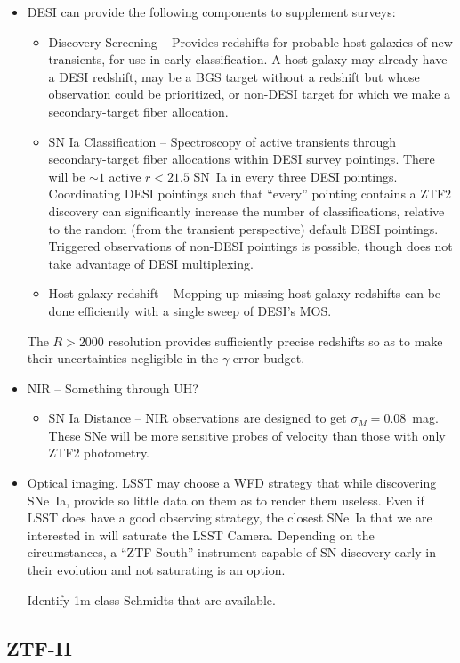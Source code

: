 \begin{itemize}
\item DESI can provide the following components to supplement surveys:
\begin{itemize}
\item Discovery Screening -- Provides redshifts for probable host galaxies of new transients, for use in early classification.  A host galaxy may
already have a DESI redshift, may be a BGS target without a redshift but whose observation could be prioritized,  or non-DESI target for which we
make a secondary-target fiber allocation.
\item SN Ia Classification -- Spectroscopy of active transients  through secondary-target fiber allocations within
DESI survey pointings. There
will be $\sim 1$ active $r<21.5$ SN~Ia in every three DESI pointings.  Coordinating DESI pointings such that ``every'' pointing contains
a  ZTF2 discovery can significantly increase the number of classifications, relative to the random (from the transient perspective) default DESI pointings.
Triggered observations of non-DESI pointings is possible, though does not take advantage of DESI multiplexing.
\item Host-galaxy redshift -- Mopping up missing host-galaxy redshifts
can be done efficiently with a single sweep of DESI's MOS.
\end{itemize}
 The $R>2000$ resolution
provides sufficiently precise redshifts so as to make their uncertainties negligible in the $\gamma$ error budget.
\item NIR -- Something through UH?
\begin{itemize}
\item SN Ia Distance -- NIR observations are designed to get $\sigma_M=0.08$~mag.  These SNe will be more sensitive probes of velocity
than those with only ZTF2 photometry.
\end{itemize}
\item Optical imaging.  LSST may choose a WFD strategy that while discovering SNe~Ia, provide so little data on them
as to render them useless.  Even if LSST does have a good observing strategy, the closest SNe~Ia that we are interested in
will saturate the LSST Camera.  Depending on the circumstances,
a ``ZTF-South'' instrument capable of SN discovery early in their evolution and not saturating is an option.

Identify 1m-class Schmidts that are available.
\end{itemize}

\subsection{ZTF-II}

